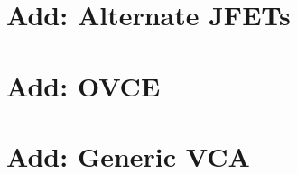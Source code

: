\documentclass[11pt]{article}
\begin{document}

\section{Add: Alternate JFETs}

\begin{circuitdiagram}[]{20}{15}
\circledtrans



\end{circuitdiagram}


\section{Add: OVCE}

\begin{circuitdiagram}[]{40}{20}


\end{circuitdiagram}


\section{Add: Generic VCA}

\begin{circuitdiagram}[]{40}{20}


\end{circuitdiagram}

\end{document}
